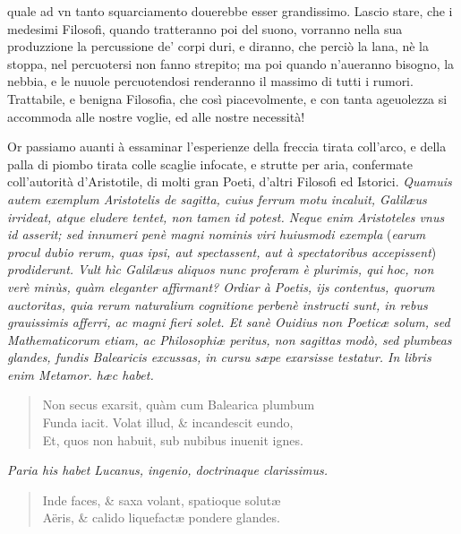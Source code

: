 \documentclass[11pt,twoside,openany]{book}
\begin{document}
quale ad vn tanto squarciamento douerebbe esser grandissimo. Lascio stare, che i medesimi Filosofi, quando tratteranno poi del suono, vorranno nella sua produzzione la percussione de' corpi duri, e diranno, che perciò la lana, nè la stoppa, nel percuotersi non fanno strepito; ma poi quando n'aueranno bisogno, la nebbia, e le nuuole percuotendosi renderanno il massimo di tutti i rumori. Trattabile, e benigna Filosofia, che così piacevolmente, e con tanta ageuolezza si accommoda alle nostre voglie, ed alle nostre necessità!



\par\bigskip\noindent{}\enspace Or passiamo auanti à essaminar l'esperienze della freccia tirata coll'arco, e della palla di piombo tirata colle scaglie infocate, e strutte per aria, confermate coll'autorità d'Aristotile, di molti gran Poeti, d'altri Filosofi ed Istorici. \textit{Quamuis autem exemplum Aristotelis de sagitta, cuius ferrum motu incaluit, Galilæus irrideat, atque eludere tentet, non tamen id potest. Neque enim Aristoteles vnus id asserit; sed innumeri penè magni nominis viri huiusmodi exempla }(\textit{earum procul dubio rerum, quas ipsi, aut spectassent, aut à spectatoribus accepissent})\textit{ prodiderunt. Vult hìc Galilæus aliquos nunc proferam è plurimis, qui }\textit{hoc, non verè minùs, quàm eleganter affirmant? Ordiar à Poetis, ijs contentus, quorum auctoritas, quia rerum naturalium cognitione perbenè instructi sunt, in rebus grauissimis afferri, ac magni fieri solet. Et sanè Ouidius non Poeticæ solum, sed Mathematicorum etiam, ac Philosophiæ peritus, non sagittas modò, sed plumbeas glandes, fundis Balearicis excussas, in cursu sæpe exarsisse testatur. In libris enim Metamor. hæc habet.}


\begin{verse}

Non secus exarsit, quàm cum Balearica plumbum \\

Funda iacit. Volat illud, \& incandescit eundo, \\

Et, quos non habuit, sub nubibus inuenit ignes. \\

\end{verse}

\textit{Paria his habet Lucanus, ingenio, doctrinaque clarissimus.}


\begin{verse}

Inde faces, \& saxa volant, spatioque solutæ \\

Aëris, \& calido liquefactæ pondere glandes. \\

\end{verse}
\end{document}
